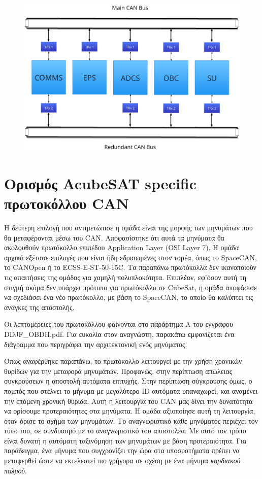 \documentclass[a4paper,nobib,justified]{tufte-book}
\begin{document}
\begin{figure}[ht]
	\includegraphics{media/diagrams/subsystems-on-buses.pdf}
	\label{fig:dual-buses}
\end{figure}


\section{Ορισμός AcubeSAT specific πρωτοκόλλου CAN}
Η δεύτερη επιλογή που αντιμετώπισε η ομάδα είναι της μορφής των μηνυμάτων που θα μεταφέρονται μέσω του CAN. Αποφασίστηκε ότι αυτά τα μηνύματα θα ακολουθούν πρωτόκολλο επιπέδου Application Layer (OSI Layer 7). Η ομάδα αρχικά εξέτασε επιλογές που είναι ήδη εδραιωμένες στον τομέα, όπως το SpaceCAN, το CANOpen ή το ECSS-E-ST-50-15C. Τα παραπάνω πρωτόκολλα δεν ικανοποιούν τις απαιτήσεις της ομάδας για χαμηλή πολυπλοκότητα. Επιπλέον, εφ'όσον αυτή τη στιγμή ακόμα δεν υπάρχει πρότυπο για πρωτόκολλο σε CubeSat, η ομάδα αποφάσισε να σχεδιάσει ένα νέο πρωτόκολλο, με βάση το SpaceCAN, το οποίο θα καλύπτει τις ανάγκες της αποστολής.

Οι λεπτομέρειες του πρωτοκόλλου φαίνονται στο παράρτημα Α του εγγράφου DDJF\_OBDH.pdf. Για ευκολία στον αναγνώστη, παρακάτω εμφανίζεται ένα διάγραμμα που περιγράφει την αρχιτεκτονική ενός μηνύματος.


Όπως αναφέρθηκε παραπάνω, το πρωτόκολλο λειτουργεί με την χρήση χρονικών θυρίδων για την μεταφορά μηνυμάτων. Προφανώς, στην περίπτωση απώλειας συγκρούσεων η αποστολή αυτόματα επιτυχής. Στην περίπτωση σύγκρουσης όμως, ο πομπός που στέλνει το μήνυμα με μεγαλύτερο ID αυτόματα υπαναχωρεί, και αναμένει την επόμενη χρονική θυρίδα. Αυτή η λειτουργία του CAN μας δίνει την δυνατότητα να ορίσουμε προτεραιότητες στα μηνύματα. Η ομάδα αξιοποίησε αυτή τη λειτουργία, όταν όρισε το σχήμα των μηνυμάτων. Το αναγνωριστικό κάθε μηνύματος περιέχει τον τύπο του, σε συνδυασμό με το αναγνωριστικό του αποστολέα. Με αυτό τον τρόπο είναι δυνατή η αυτόματη ταξινόμηση των μηνυμάτων με βάση προτεραιότητα. Για παράδειγμα, ένα μήνυμα που συγχρονίζει την ώρα στα υποσυστήματα πρέπει να μεταφερθεί ώστε να εκτελεστεί πιο γρήγορα σε σχέση με ένα μήνυμα \textit{καρδιακού παλμού}.
\end{document}
